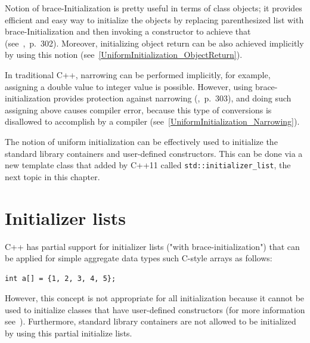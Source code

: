 \documentclass[11pt]{report}
\begin{document}
Notion of brace-Initialization is pretty useful in terms of class objects; it provides efficient and easy way to initialize the objects by replacing parenthesized list with brace-Initialization and then invoking a constructor to achieve that (see~\cite{Gregorie:professionalcpp},~p.~302). Moreover, initializing object return can be also achieved implicitly by using this notion (see~\ref{UniformInitialization_ObjectReturn}).

In traditional C++, narrowing can be performed implicitly, for example, assigning a double value to integer value is possible. However, using brace-initialization provides protection against narrowing (\cite{Gregorie:professionalcpp},~p.~303), and doing such assigning above causes compiler error, because this type of conversions is disallowed to accomplish by a compiler (see~\ref{UniformInitialization_Narrowing}).

The notion of uniform initialization can be effectively used to initialize the standard library containers and user-defined constructors. This can be done via a new template class that added by C++11 called \texttt{std::initializer\_list}, the next topic in this chapter.

\section{Initializer lists}
\label{section: Initializer lists}
C++ has partial support for initializer lists ("with brace-initialization") that can be applied for simple aggregate data types such C-style arrays as follows:
\begin{lstlisting}
int a[] = {1, 2, 3, 4, 5};
\end{lstlisting}
However, this concept is not appropriate for all initialization because it cannot be used to initialize classes that have user-defined constructors (for more information see~\cite{Stroustrup:2012:Cpp11}). Furthermore, standard library containers are not allowed to be initialized by using this partial initialize lists.
\end{document}
